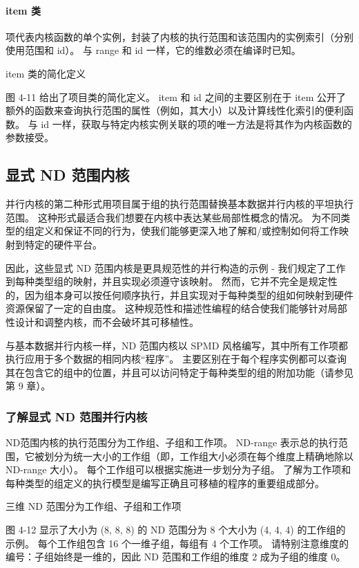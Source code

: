 \paragraph{item 类}

项代表内核函数的单个实例，封装了内核的执行范围和该范围内的实例索引（分别使用范围和 id）。 
与 range 和 id 一样，它的维数必须在编译时已知。

{\color{red} item 类的简化定义}

图 4-11 给出了项目类的简化定义。 
item 和 id 之间的主要区别在于 item 公开了额外的函数来查询执行范围的属性（例如，其大小）以及计算线性化索引的便利函数。 
与 id 一样，获取与特定内核实例关联的项的唯一方法是将其作为内核函数的参数接受。

\subsection{显式 ND 范围内核}
并行内核的第二种形式用项目属于组的执行范围替换基本数据并行内核的平坦执行范围。 
这种形式最适合我们想要在内核中表达某些局部性概念的情况。 
为不同类型的组定义和保证不同的行为，使我们能够更深入地了解和/或控制如何将工作映射到特定的硬件平台。

因此，这些显式 ND 范围内核是更具规范性的并行构造的示例 - 我们规定了工作到每种类型组的映射，并且实现必须遵守该映射。 
然而，它并不完全是规定性的，因为组本身可以按任何顺序执行，并且实现对于每种类型的组如何映射到硬件资源保留了一定的自由度。 
这种规范性和描述性编程的结合使我们能够针对局部性设计和调整内核，而不会破坏其可移植性。

与基本数据并行内核一样，ND 范围内核以 SPMD 风格编写，其中所有工作项都执行应用于多个数据的相同内核“程序”。 
主要区别在于每个程序实例都可以查询其在包含它的组中的位置，并且可以访问特定于每种类型的组的附加功能（请参见第 9 章）。

\subsubsection{了解显式 ND 范围并行内核}
ND范围内核的执行范围分为工作组、子组和工作项。 
ND-range 表示总的执行范围，它被划分为统一大小的工作组（即，工作组大小必须在每个维度上精确地除以 ND-range 大小）。 
每个工作组可以根据实施进一步划分为子组。 
了解为工作项和每种类型的组定义的执行模型是编写正确且可移植的程序的重要组成部分。

{\color{red} 三维 ND 范围分为工作组、子组和工作项}

图 4-12 显示了大小为 (8, 8, 8) 的 ND 范围分为 8 个大小为 (4, 4, 4) 的工作组的示例。 
每个工作组包含 16 个一维子组，每组有 4 个工作项。 
请特别注意维度的编号：子组始终是一维的，因此 ND 范围和工作组的维度 2 成为子组的维度 0。

